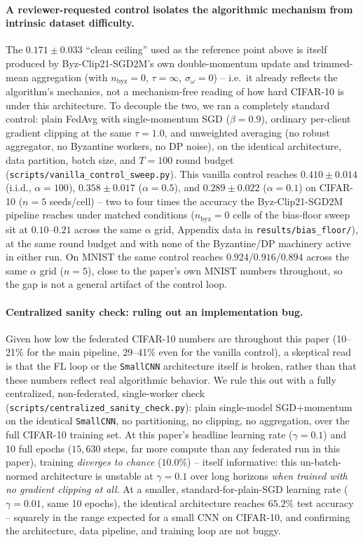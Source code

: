 \documentclass{article}
\begin{document}
\paragraph{A reviewer-requested control isolates the algorithmic mechanism
from intrinsic dataset difficulty.} The $0.171\pm0.033$ ``clean ceiling'' used
as the reference point above is itself produced by
Byz-Clip21-SGD2M's own double-momentum update and trimmed-mean aggregation
(with $n_{\text{byz}}{=}0$, $\tau{=}\infty$, $\sigma_\omega{=}0$) -- i.e.\ it
already reflects the algorithm's mechanics, not a mechanism-free reading of
how hard CIFAR-10 is under this architecture. To decouple the two, we ran a
completely standard control: plain FedAvg with single-momentum SGD
($\beta{=}0.9$), ordinary per-client gradient clipping at the same
$\tau{=}1.0$, and unweighted averaging (no robust aggregator, no Byzantine
workers, no DP noise), on the identical architecture, data partition, batch
size, and $T{=}100$ round budget (\texttt{scripts/vanilla\_control\_sweep.py}).
This vanilla control reaches $0.410\pm0.014$ (i.i.d., $\alpha{=}100$),
$0.358\pm0.017$ ($\alpha{=}0.5$), and $0.289\pm0.022$ ($\alpha{=}0.1$) on
CIFAR-10 ($n{=}5$ seeds/cell) -- two to four times the accuracy the
Byz-Clip21-SGD2M pipeline reaches under matched conditions ($n_{\text{byz}}{=}0$
cells of the bias-floor sweep sit at $0.10$--$0.21$ across the same
$\alpha$ grid, Appendix data in \texttt{results/bias\_floor/}), at the same
round budget and with none of the Byzantine/DP machinery active in either run.
On MNIST the same control reaches $0.924$/$0.916$/$0.894$ across the same
$\alpha$ grid ($n{=}5$), close to the paper's own MNIST numbers throughout,
so the gap is not a general artifact of the control loop.

\paragraph{Centralized sanity check: ruling out an implementation bug.} Given
how low the federated CIFAR-10 numbers are throughout this paper (10--21\%
for the main pipeline, 29--41\% even for the vanilla control), a skeptical
read is that the FL loop or the \texttt{SmallCNN} architecture itself is
broken, rather than that these numbers reflect real algorithmic behavior. We
rule this out with a fully centralized, non-federated, single-worker check
(\texttt{scripts/centralized\_sanity\_check.py}): plain single-model
SGD+momentum on the identical \texttt{SmallCNN}, no partitioning, no
clipping, no aggregation, over the full CIFAR-10 training set. At this
paper's headline learning rate ($\gamma{=}0.1$) and 10 full epochs
($15{,}630$ steps, far more compute than any federated run in this paper),
training \emph{diverges to chance} ($10.0\%$) -- itself informative: this
un-batch-normed architecture is unstable at $\gamma{=}0.1$ over long
horizons \emph{when trained with no gradient clipping at all}. At a
smaller, standard-for-plain-SGD learning rate ($\gamma{=}0.01$, same 10
epochs), the identical architecture reaches $65.2\%$ test accuracy -- squarely
in the range expected for a small CNN on CIFAR-10, and confirming the
architecture, data pipeline, and training loop are not buggy.
\end{document}
